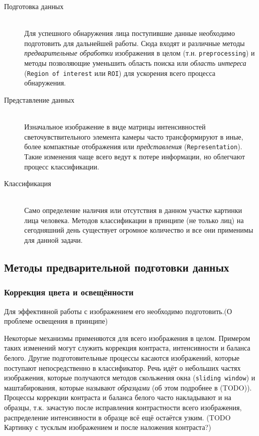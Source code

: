 \documentclass[12pt]{report}
\begin{document}
\begin{description}

\item[Подготовка данных]\hfill \\
	Для успешного обнаружения лица поступившие данные необходимо подготовить для дальнейшей работы. Сюда входят и различные методы \emph{предварительные обработки} изображения в целом (т.н. \texttt{preprocessing}) и методы позволяющие уменьшить область поиска или \emph{область интереса} (\texttt{Region of interest} или \texttt{ROI}) для ускорения всего процесса обнаружения.
\item[Представление данных]\hfill \\ 
	Изначальное изображение в виде матрицы интенсивностей светочувствительного элемента камеры часто трансформируют в иные, более компактные отображения или \emph{представления} (\texttt{Representation}). Такие изменения чаще всего ведут к потере информации, но облегчают процесс классификации.
\item[Классификация]\hfill \\ 
	Само определение наличия или отсутствия в данном участке картинки лица человека. Методов классификации в принципе (не только лиц) на сегодняшний день существует огромное количество и все они применимы для данной задачи.
\end{description}

\subsection{Методы предварительной подготовки данных}
\subsubsection{Коррекция цвета и освещённости}
\label{sec:preprocessing_theor}
Для эффективной работы с изображением его необходимо подготовить.(О проблеме освещения в принципе)

Некоторые механизмы применяются для всего изображения в целом. Примером таких изменений могут служить коррекция контраста, интенсивности и баланса белого. Другие подготовительные процессы касаются изображений, которые поступают непосредственно в классификатор. Речь идёт о небольших частях изображения, которые получаются методов скольжения окна (\texttt{sliding window}) и маштабирования, которые называют \emph{образцами} (об этом подробнее в (TODO)). Процессы коррекции контраста и баланса белого часто накладывают и на образцы, т.к. зачастую после исправления контрастности всего изображения, распределение интенсивности в образце всё ещё остаётся узким.
(TODO Картинку с тусклым изображением и после наложения контраста?)
\end{document}

